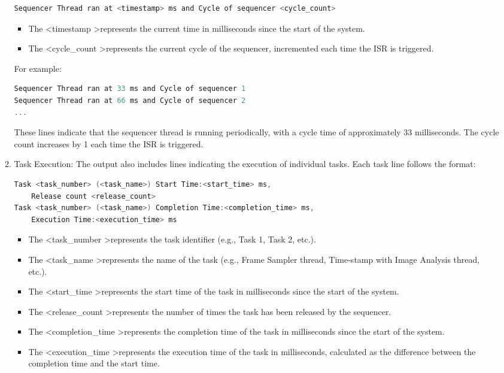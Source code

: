 \documentclass[a4paper,11pt]{article}%
\newenvironment{qanda}{\setlength{\parindent}{0pt}}{\bigskip}
\begin{document}
\begin{qanda}
\begin{enumerate}
\begin{enumerate}
				      \begin{lstlisting}[language=C]
Sequencer Thread ran at <timestamp> ms and Cycle of sequencer <cycle_count>
\end{lstlisting}
				      \begin{itemize}
					      \item The \textless timestamp \textgreater represents the current time in milliseconds since
					            the start of the system.

					      \item The \textless cycle\_count \textgreater represents the current cycle of the sequencer,
					            incremented each time the ISR is triggered.
				      \end{itemize}
				      For example:

				      \begin{lstlisting}[language=C]
Sequencer Thread ran at 33 ms and Cycle of sequencer 1
Sequencer Thread ran at 66 ms and Cycle of sequencer 2
...
\end{lstlisting}
				      These lines indicate that the sequencer thread is running periodically, with a cycle time of approximately 33 milliseconds. The cycle count increases by 1 each time the ISR is triggered.


				\item Task Execution: The output also includes lines indicating the execution of individual tasks. Each task line follows the format:
				      \begin{lstlisting}[language=C]
Task <task_number> (<task_name>) Start Time:<start_time> ms, 
	Release count <release_count>
Task <task_number> (<task_name>) Completion Time:<completion_time> ms, 
	Execution Time:<execution_time> ms
				\end{lstlisting}
				      \begin{itemize}
					      \item The \textless task\_number \textgreater represents the task identifier (e.g., Task 1, Task 2, etc.).
					      \item The \textless task\_name \textgreater represents the name of the task (e.g., Frame Sampler thread, Time-stamp with Image Analysis thread, etc.).
					      \item The \textless start\_time \textgreater represents the start time of the task in milliseconds since the start of the system.
					      \item The \textless release\_count \textgreater represents the number of times the task has been released by the sequencer.
					      \item The \textless completion\_time \textgreater represents the completion time of the task in milliseconds since the start of the system.
					      \item The \textless execution\_time \textgreater represents the execution time of the task in milliseconds, calculated as the difference between the completion time and the start time.
				      \end{itemize}


\end{enumerate}
\end{enumerate}
\end{qanda}
\end{document}
